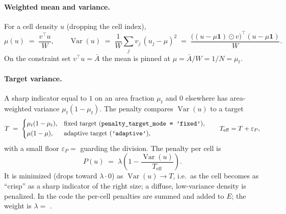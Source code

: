 \documentclass[11pt,a4paper]{article}
\begin{document}
\paragraph{Weighted mean and variance.}
For a cell density $u$ (dropping the cell index),
\begin{equation}
  \mu(u) \;=\; \frac{v^\top u}{W},
  \qquad
  \operatorname{Var}(u) \;=\; \frac{1}{W}\sum_j v_j\,(u_j - \mu)^2
  \;=\; \frac{\big((u-\mu\mathbf 1)\odot v\big)^\top (u-\mu\mathbf 1)}{W}.
  \label{eq:weighted-varmean}
\end{equation}
On the constraint set $v^\top u = \bar A$ the mean is pinned at $\mu = \bar A/W = 1/N
= \mu_t$.

\paragraph{Target variance.}
A sharp indicator equal to $1$ on an area fraction $\mu_t$ and $0$ elsewhere has
area-weighted variance $\mu_t(1-\mu_t)$. The penalty compares $\operatorname{Var}(u)$
to a target
\begin{equation}
  T \;=\;
  \begin{dcases}
    \mu_t(1-\mu_t), & \text{fixed target (\texttt{penalty\_target\_mode = 'fixed'})},\\
    \mu(1-\mu),     & \text{adaptive target (\texttt{'adaptive'})},
  \end{dcases}
  \qquad
  T_{\mathrm{eff}} = T + \varepsilon_P,
  \label{eq:target-var}
\end{equation}
with a small floor $\varepsilon_P = $  guarding the division. The
penalty per cell is
\begin{equation}
  P(u) \;=\; \lambda\left(1 - \frac{\operatorname{Var}(u)}{T_{\mathrm{eff}}}\right).
  \label{eq:penalty}
\end{equation}
It is minimized (drops toward $\lambda\cdot 0$) as $\operatorname{Var}(u)\to T$, i.e.\
as the cell becomes as ``crisp'' as a sharp indicator of the right size; a diffuse,
low-variance density is penalized. In the code the per-cell penalties are summed and
added to $E$; the weight is $\lambda=$ \code{lambda\_penalty}.
\end{document}
